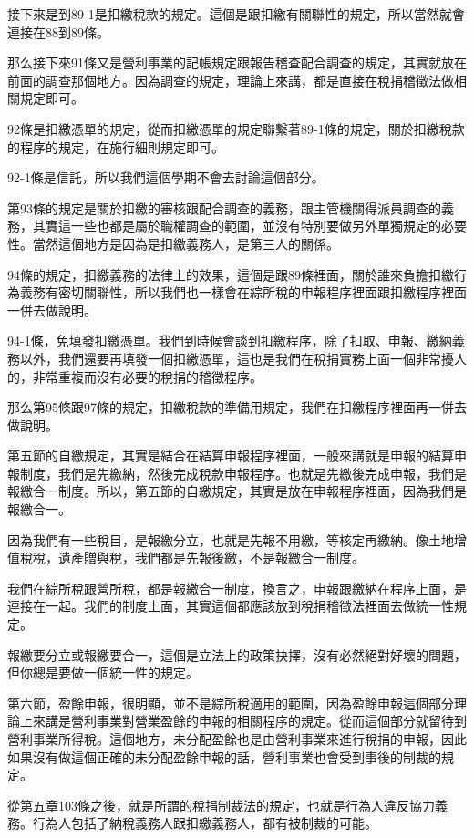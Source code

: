 \documentclass[oneside,sub3section]{ctexbook}
\begin{document}
接下來是到89-1是扣繳稅款的規定。這個是跟扣繳有關聯性的規定，所以當然就會連接在88到89條。

那么接下來91條又是營利事業的記帳規定跟報告稽查配合調查的規定，其實就放在前面的調查那個地方。因為調查的規定，理論上來講，都是直接在稅捐稽徵法做相關規定即可。

92條是扣繳憑單的規定，從而扣繳憑單的規定聯繫著89-1條的規定，關於扣繳稅款的程序的規定，在施行細則規定即可。

92-1條是信託，所以我們這個學期不會去討論這個部分。

第93條的規定是關於扣繳的審核跟配合調查的義務，跟主管機關得派員調查的義務，其實這一些也都是屬於職權調查的範圍，並沒有特別要做另外單獨規定的必要性。當然這個地方是因為是扣繳義務人，是第三人的關係。

94條的規定，扣繳義務的法律上的效果，這個是跟89條裡面，關於誰來負擔扣繳行為義務有密切關聯性，所以我們也一樣會在綜所稅的申報程序裡面跟扣繳程序裡面一併去做說明。

94-1條，免填發扣繳憑單。我們到時候會談到扣繳程序，除了扣取、申報、繳納義務以外，我們還要再填發一個扣繳憑單，這也是我們在稅捐實務上面一個非常擾人的，非常重複而沒有必要的稅捐的稽徵程序。

那么第95條跟97條的規定，扣繳稅款的準備用規定，我們在扣繳程序裡面再一併去做說明。

第五節的自繳規定，其實是結合在結算申報程序裡面，一般來講就是申報的結算申報制度，我們是先繳納，然後完成稅款申報程序。也就是先繳後完成申報，我們是報繳合一制度。所以，第五節的自繳規定，其實是放在申報程序裡面，因為我們是報繳合一。

因為我們有一些稅目，是報繳分立，也就是先報不用繳，等核定再繳納。像土地增值稅稅，遺產贈與稅，我們都是先報後繳，不是報繳合一制度。

我們在綜所稅跟營所稅，都是報繳合一制度，換言之，申報跟繳納在程序上面，是連接在一起。我們的制度上面，其實這個都應該放到稅捐稽徵法裡面去做統一性規定。

報繳要分立或報繳要合一，這個是立法上的政策抉擇，沒有必然絕對好壞的問題，但你總是要做一個統一性的規定。

第六節，盈餘申報，很明顯，並不是綜所稅適用的範圍，因為盈餘申報這個部分理論上來講是營利事業對營業盈餘的申報的相關程序的規定。從而這個部分就留待到營利事業所得稅。這個地方，未分配盈餘也是由營利事業來進行稅捐的申報，因此如果沒有做這個正確的未分配盈餘申報的話，營利事業也會受到事後的制裁的規定。

從第五章103條之後，就是所謂的稅捐制裁法的規定，也就是行為人違反協力義務。行為人包括了納稅義務人跟扣繳義務人，都有被制裁的可能。
\end{document}
